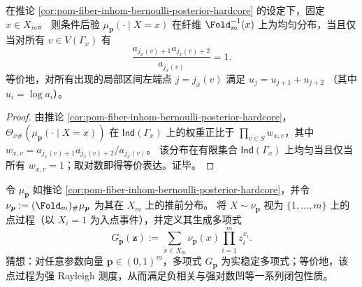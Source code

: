 \begin{proposition}[条件均匀性与活度场平坦性]\label{prop:pom-fiber-inhom-conditional-uniformity}
在推论 \ref{cor:pom-fiber-inhom-bernoulli-posterior-hardcore} 的设定下，固定 \(x\in X_m\)。
则条件后验 \(\mu_{\boldsymbol p}(\cdot\mid X=x)\) 在纤维 \(\Fold_m^{-1}(x)\) 上为均匀分布，当且仅当对所有 \(v\in V(\Gamma_x)\) 有
\[
\frac{a_{j_x(v)+1}a_{j_x(v)+2}}{a_{j_x(v)}}=1.
\]
等价地，对所有出现的局部区间左端点 \(j=j_x(v)\) 满足
\(
u_{j}=u_{j+1}+u_{j+2}
\)
（其中 \(u_i=\log a_i\)）。
\end{proposition}

\begin{proof}
由推论 \ref{cor:pom-fiber-inhom-bernoulli-posterior-hardcore}，
\(\Theta_{x\#}(\mu_{\boldsymbol p}(\cdot\mid X=x))\) 在 \(\mathsf{Ind}(\Gamma_x)\) 上的权重正比于 \(\prod_{v\in S}w_{x,v}\)，其中
\(
w_{x,v}=a_{j_x(v)+1}a_{j_x(v)+2}/a_{j_x(v)}
\)。
该分布在有限集合 \(\mathsf{Ind}(\Gamma_x)\) 上均匀当且仅当所有 \(w_{x,v}=1\)；取对数即得等价表达。证毕。
\end{proof}




\begin{conjecture}\label{conj:pom-fold-pushforward-strong-rayleigh}
令 \(\mu_{\boldsymbol p}\) 如推论 \ref{cor:pom-fiber-inhom-bernoulli-posterior-hardcore}，并令 \(\nu_{\boldsymbol p}:=(\Fold_m)_{\#}\mu_{\boldsymbol p}\) 为其在 \(X_m\) 上的推前分布。
将 \(X\sim \nu_{\boldsymbol p}\) 视为 \(\{1,\dots,m\}\) 上的点过程（以 \(X_i=1\) 为入点事件），并定义其生成多项式
\[
G_{\boldsymbol p}(\boldsymbol{z})
:=\sum_{x\in X_m}\nu_{\boldsymbol p}(x)\prod_{i=1}^{m} z_i^{x_i}.
\]
猜想：对任意参数向量 \(\boldsymbol p\in(0,1)^m\)，多项式 \(G_{\boldsymbol p}\) 为实稳定多项式；等价地，该点过程为强 Rayleigh 测度，从而满足负相关与强对数凹等一系列闭包性质。
\end{conjecture}

